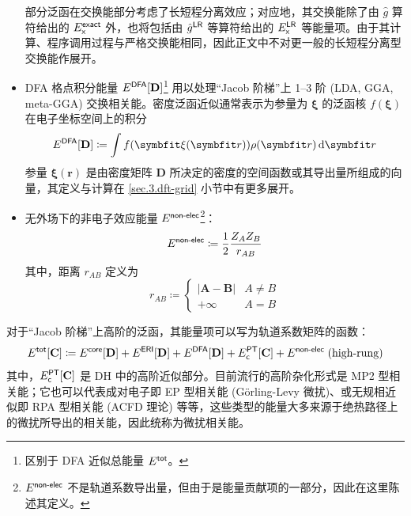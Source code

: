 \begin{itemize}[nosep]
\begin{equation}
\end{equation}
部分泛函在交换能部分考虑了长短程分离效应；对应地，其交换能除了由 $\hat g$ 算符给出的 $E_{\textsf{x}}^{\textsf{exact}}$ 外，也将包括由 $\hat g^{\textsf{LR}}$ 等算符给出的 $E_{\textsf{x}}^{\textsf{LR}}$ 等能量项。由于其计算、程序调用过程与严格交换能相同，因此正文中不对更一般的长短程分离型交换能作展开。
\item DFA 格点积分能量 $E^{\textsf{DFA}} [\mathbf{D}]$\footnote{区别于 DFA 近似总能量 $E^{\textsf{tot}}$。} 用以处理“Jacob 阶梯”上 1--3 阶 (LDA, GGA, meta-GGA) 交换相关能。密度泛函近似通常表示为参量为 $\bm{\xi}$ 的泛函核 $f(\bm{\xi})$ 在电子坐标空间上的积分
\begin{equation}
    \label{eq.3.def.dfa-energy}
    E^\textmt{DFA} [\mathbf{D}] \coloneq \int f(\bm{\xi}(\bm{r})) \rho (\bm{r}) \, \mathrm{d} \bm{r}
\end{equation}
参量 $\bm{\xi} (\bm{r})$ 是由密度矩阵 $\mathbf{D}$ 所决定的密度的空间函数或其导出量所组成的向量，其定义与计算在 \ref{sec.3.dft-grid} 小节中有更多展开。
\item 无外场下的非电子效应能量 $E^{\textsf{non-elec}}$\footnote{$E^{\textsf{non-elec}}$ 不是轨道系数导出量，但由于是能量贡献项的一部分，因此在这里陈述其定义。}：
\begin{equation}
    E^{\textsf{non-elec}} \coloneq \frac{1}{2} \frac{Z_A Z_B}{r_{AB}}
\end{equation}
其中，距离 $r_{AB}$ 定义为
\begin{equation*}
    r_{AB} \coloneq
    \begin{cases}
        | \boldsymbol{A} - \boldsymbol{B} | & A \neq B \\
        + \infty & A = B
    \end{cases}
\end{equation*}
\end{itemize}

对于“Jacob 阶梯”上高阶的泛函，其能量项可以写为轨道系数矩阵的函数：
\begin{equation}
    E^{\textsf{tot}}[\mathbf{C}] \coloneq E^{\textsf{core}} [\mathbf{D}] + E^{\textsf{ERI}} [\mathbf{D}] + E^{\textsf{DFA}} [\mathbf{D}] + E_{\textsf{c}}^{\textsf{PT}} [\mathbf{C}] + E^{\textsf{non-elec}} \; \text{(high-rung)}
\end{equation}
其中，$E_{\textsf{c}}^{\textsf{PT}} [\mathbf{C}]$ 是 DH 中的高阶近似部分。目前流行的高阶杂化形式是 MP2 型相关能；它也可以代表成对电子即 EP 型相关能 (G{\"o}rling-Levy 微扰)、或无规相近似即 RPA 型相关能 (ACFD 理论) 等等，这些类型的能量大多来源于绝热路径上的微扰所导出的相关能，因此统称为微扰相关能。

